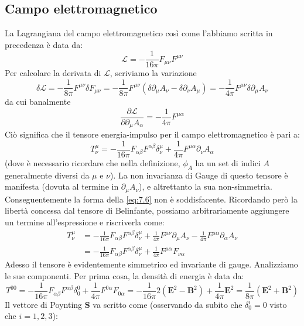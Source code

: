 \documentclass[a4paper,11pt]{book}
\theoremstyle{plain}
\theoremstyle{definition}
\begin{document}
\subsection{Campo elettromagnetico}
La Lagrangiana del campo elettromagnetico così come l'abbiamo scritta in precedenza è data da:
\[
\mathcal{L} = -\frac{1}{16\pi}F_{\mu\nu}F^{\mu\nu}
\]
Per calcolare la derivata di $\mathcal{L}$, scriviamo la variazione
\[
\delta \mathcal{L} = -\frac{1}{8\pi}F^{\mu\nu}\delta F_{\mu\nu}=-\frac{1}{8\pi}F^{\mu\nu}(\delta \partial_{\mu}A_{\nu} -\delta\partial_{\nu}A_{\mu} ) = -\frac{1}{4\pi}F^{\mu\nu}\delta\partial_{\mu}A_{\nu}
\]
da cui banalmente
\[
\frac{\partial \mathcal{L}}{\partial\partial_{\mu}A_{\alpha}}=-\frac{1}{4\pi}F^{\mu\alpha}
\]
Ciò significa che il tensore energia-impulso per il campo elettromagnetico è pari a:
\begin{equation}\label{eq:7.6}
T^{\mu}_{\nu} = -\frac{1}{16\pi}F_{\alpha\beta}F^{\alpha\beta}\delta^{\mu}_{\nu}+\frac{1}{4\pi}F^{\mu\alpha}\partial_{\nu}A_{\alpha}
\end{equation}
(dove è necessario ricordare che nella definizione, $\phi_A$ ha un set di indici $A$ generalmente diversi da $\mu$ e $\nu$). La non invarianza di Gauge di questo tensore è manifesta (dovuta al termine in $\partial_{\mu}A_{\nu}$), e altrettanto la sua non-simmetria. Conseguentemente la forma della \eqref{eq:7.6} non è soddisfacente. Ricordando però la libertà concessa dal tensore di Belinfante, possiamo arbitrariamente aggiungere un termine all'espressione e riscriverla come:
\begin{equation}\label{eq:7.7}
\begin{split}
T^{\mu}_{\nu} &= -\frac{1}{16\pi}F_{\alpha\beta}F^{\alpha\beta}\delta^{\mu}_{\nu}+\frac{1}{4\pi}F^{\mu\nu}\partial_{\mu}A_{\nu}-\frac{1}{4\pi}F^{\mu\alpha}\partial_{\alpha}A_{\nu}  \\
&= -\frac{1}{16\pi}F_{\alpha\beta}F^{\alpha\beta}\delta^{\mu}_{\nu}+\frac{1}{4\pi}F^{\mu\alpha}F_{\nu\alpha}
\end{split}
\end{equation}
Adesso il tensore è evidentemente simmetrico ed invariante di gauge. Analizziamo le sue componenti. Per prima cosa, la densità di energia è data da:
\[
T^{00} = -\frac{1}{16\pi}F_{\alpha\beta}F^{\alpha\beta}\delta^0_0 +\frac{1}{4\pi}F^{0\alpha}F_{0\alpha} = -\frac{1}{16\pi}2(\textbf{E}^2-\textbf{B}^2) + \frac{1}{4\pi}\textbf{E}^2 = \frac{1}{8\pi}(\textbf{E}^2+\textbf{B}^2)
\]
Il vettore di Poynting $\textbf{S}$ va scritto come (osservando da subito che $\delta_0^i =0$ visto che $i=1,2,3$):
\end{document}
